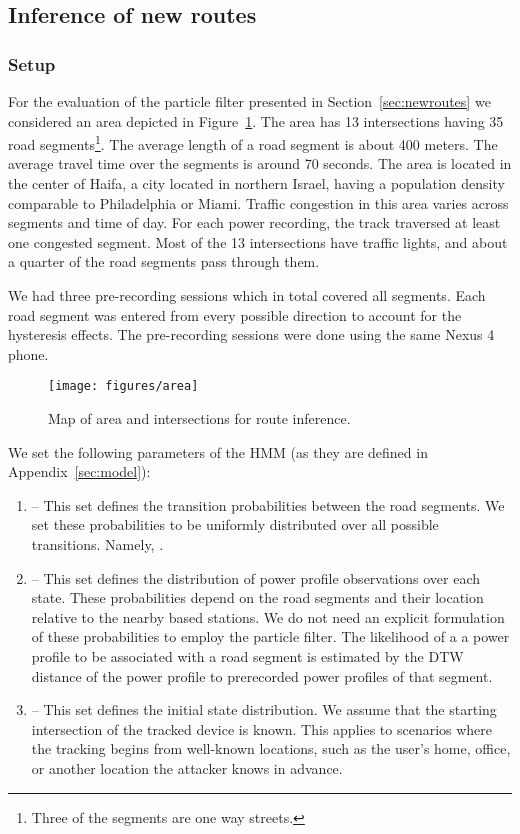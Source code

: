 \subsection{Inference of new routes}
\subsubsection{Setup}

For the evaluation of the particle filter presented in Section~\ref{sec:newroutes} we considered an area
 depicted in Figure~\ref{fig:area}. The area has 13 intersections
having 35 road segments\footnote{Three of the segments are one way streets.}. The
average length of a road segment is about 400 meters. The average travel time over the segments is around 70
seconds. The area is located in the center of Haifa, a city located in northern Israel, having a population density comparable to Philadelphia or Miami. 
Traffic congestion in this area varies across segments and time of day.
For each power recording, the track traversed at least one congested segment.
Most of the 13 intersections have traffic lights, and about a quarter of the road segments pass through them.

We had three pre-recording sessions which in total covered all segments. Each road segment was entered from every possible direction to account for the hysteresis effects.
The pre-recording sessions were done using the same Nexus 4 phone.

\begin{figure}
    \centering
    \texttt{[image: figures/area]}
    \caption{Map of area and intersections for route inference.}
    \label{fig:area}
\end{figure}

We set the following  parameters of the HMM (as they are defined in Appendix~\ref{sec:model}):
\begin{enumerate}
    \item  -- This set defines the transition probabilities between the road segments.
    We set these probabilities to be uniformly distributed over all possible transitions.
    Namely, .
    \item  -- This set defines the distribution of power profile observations over each state.
    These probabilities depend on the road segments and their location relative to the nearby based stations.
    We do not need an explicit formulation of these probabilities to employ the particle filter.
    The likelihood of a a power profile to be associated with a road segment is estimated by the DTW distance of
    the power profile to prerecorded power profiles of that segment.
    \item  -- This set defines the initial state distribution.
    We assume that the starting intersection of the tracked device is known.
    This applies to scenarios where the tracking begins from well-known locations, such as the user's home,
    office, or another location the attacker knows in advance.
\end{enumerate}

